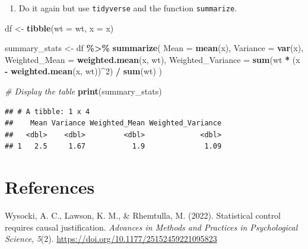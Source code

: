 \documentclass[
  doc]{apa6}
\newenvironment{Shaded}{\begin{snugshade}}{\end{snugshade}}
\newcommand{\AttributeTok}[1]{\textcolor[rgb]{0.13,0.29,0.53}{#1}}
\newcommand{\CommentTok}[1]{\textcolor[rgb]{0.56,0.35,0.01}{\textit{#1}}}
\newcommand{\DecValTok}[1]{\textcolor[rgb]{0.00,0.00,0.81}{#1}}
\newcommand{\FunctionTok}[1]{\textcolor[rgb]{0.13,0.29,0.53}{\textbf{#1}}}
\newcommand{\NormalTok}[1]{#1}
\newcommand{\OtherTok}[1]{\textcolor[rgb]{0.56,0.35,0.01}{#1}}
\newcommand{\SpecialCharTok}[1]{\textcolor[rgb]{0.81,0.36,0.00}{\textbf{#1}}}
\providecommand{\tightlist}{%
  \setlength{\itemsep}{0pt}\setlength{\parskip}{0pt}}
\newlength{\cslhangindent}
\newenvironment{CSLReferences}[2] %
 {\begin{list}{}{%
  \setlength{\itemindent}{0pt}
  \setlength{\leftmargin}{0pt}
  \setlength{\parsep}{0pt}
  \ifodd #1
   \setlength{\leftmargin}{\cslhangindent}
   \setlength{\itemindent}{-1\cslhangindent}
  \fi
  \setlength{\itemsep}{#2\baselineskip}}}
 {\end{list}}
\begin{document}
\begin{enumerate}
\def\labelenumi{\alph{enumi})}
\setcounter{enumi}{1}
\tightlist
\item
  Do it again but use \texttt{tidyverse} and the function \texttt{summarize}.
\end{enumerate}

\begin{Shaded}
\begin{Highlighting}[]
\NormalTok{df }\OtherTok{\textless{}{-}} \FunctionTok{tibble}\NormalTok{(}\AttributeTok{wt =}\NormalTok{ wt, }\AttributeTok{x =}\NormalTok{ x)}

\NormalTok{summary\_stats }\OtherTok{\textless{}{-}}\NormalTok{ df }\SpecialCharTok{\%\textgreater{}\%}
  \FunctionTok{summarize}\NormalTok{(}
    \AttributeTok{Mean =} \FunctionTok{mean}\NormalTok{(x),}
    \AttributeTok{Variance =} \FunctionTok{var}\NormalTok{(x),}
    \AttributeTok{Weighted\_Mean =} \FunctionTok{weighted.mean}\NormalTok{(x, wt),}
    \AttributeTok{Weighted\_Variance =} \FunctionTok{sum}\NormalTok{(wt }\SpecialCharTok{*}\NormalTok{ (x }\SpecialCharTok{{-}} \FunctionTok{weighted.mean}\NormalTok{(x, wt))}\SpecialCharTok{\^{}}\DecValTok{2}\NormalTok{) }\SpecialCharTok{/} \FunctionTok{sum}\NormalTok{(wt)}
\NormalTok{  )}

\CommentTok{\# Display the table}
\FunctionTok{print}\NormalTok{(summary\_stats)}
\end{Highlighting}
\end{Shaded}

\begin{verbatim}
## # A tibble: 1 x 4
##    Mean Variance Weighted_Mean Weighted_Variance
##   <dbl>    <dbl>         <dbl>             <dbl>
## 1   2.5     1.67           1.9              1.09
\end{verbatim}

\section*{References}\label{references}

\label{refs}
\begin{CSLReferences}{1}{0}
Wysocki, A. C., Lawson, K. M., \& Rhemtulla, M. (2022). Statistical control requires causal justification. \emph{Advances in Methods and Practices in Psychological Science}, \emph{5}(2). \url{https://doi.org/10.1177/25152459221095823}

\end{CSLReferences}
\end{document}
